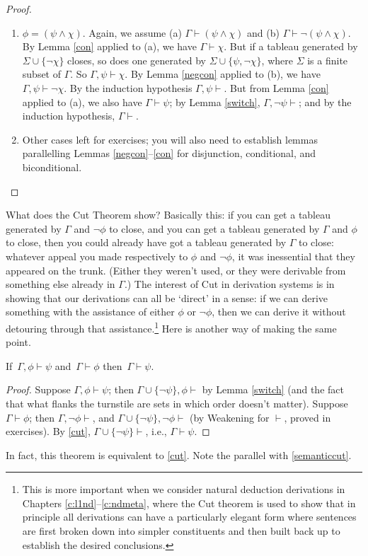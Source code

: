 \begin{proof}
\begin{enumerate}
\item $\phi = (\psi\wedge\chi)$. Again, we assume (a) $\Gamma \vdash (\psi\wedge\chi)$ and (b) $\Gamma \vdash \neg(\psi\wedge\chi)$. By Lemma \ref{con} applied to (a), we have $\Gamma\vdash\chi$. But if a tableau generated by $\Sigma\cup\{\neg\chi\}$ closes, so does one generated by $\Sigma\cup\{\psi,\neg\chi\}$, where $\Sigma$ is a finite subset of $\Gamma$. So $\Gamma,\psi\vdash\chi$. By Lemma \ref{negcon} applied to (b), we have $\Gamma,\psi\vdash\neg\chi$. By the induction hypothesis $\Gamma,\psi\vdash$. But from Lemma \ref{con} applied to (a), we also have $\Gamma\vdash\psi$; by Lemma \ref{switch}, $\Gamma,\neg\psi\vdash$; and by the induction hypothesis, $\Gamma\vdash$. 
\item Other cases left for exercises; you will also need to establish lemmas parallelling Lemmas \ref{negcon}–\ref{con} for disjunction, conditional, and biconditional. 
	\end{enumerate} 
\end{proof}

What does the Cut Theorem show? Basically this: if you can get a tableau generated by $\Gamma$ and $\neg\phi$ to close, and you can get a tableau generated by $\Gamma$ and $\phi$ to close, then you could already have got a tableau generated by $\Gamma$ to close: whatever appeal you made respectively to $\phi$ and $\neg\phi$, it was inessential that they appeared on the trunk. (Either they weren't used, or they were derivable from something else already in $\Gamma$.) The interest of Cut in derivation systems is in showing that our derivations can all be `direct' in a sense: if we can derive something with the assistance of either $\phi$ or $¬\phi$, then we can derive it without detouring through that assistance.\footnote{This is more important when we consider natural deduction derivations in Chapters \ref{c:l1nd}–\ref{c:ndmeta}, where the Cut theorem is used to show that in principle all derivations can have a particularly elegant form where sentences are first broken down into simpler constituents and then built back up to establish the desired conclusions.}
Here is another way of making the same point. \begin{theorem}\label{cutagain}
	If\, $\Gamma, \phi\vdash \psi$ and\, $\Gamma\vdash \phi$ then\, $\Gamma\vdash \psi$. \begin{proof}
		Suppose $\Gamma,\phi\vdash \psi$; then $\Gamma\cup\{¬\psi\}, \phi\vdash$ by Lemma \ref{switch} (and the fact that what flanks the turnstile are sets in which order doesn't matter). Suppose $\Gamma\vdash \phi$; then $\Gamma,¬ \phi\vdash$, and $\Gamma\cup\{¬\psi\},¬ \phi\vdash$ (by Weakening for $\vdash$, proved in exercises). By \autoref{cut}, $\Gamma\cup\{¬ \psi\}\vdash$, i.e., $\Gamma\vdash \psi$.
	\end{proof}
\end{theorem} In fact, this theorem is equivalent to \autoref{cut}. Note the parallel with \autoref{semanticcut}.

